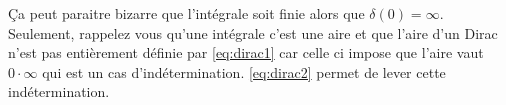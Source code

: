 Ça peut paraitre bizarre que l'intégrale soit finie alors que
$\delta(0) = \infty$.
Seulement, rappelez vous qu'une intégrale c'est une aire et que
l'aire d'un Dirac n'est pas entièrement définie par \eqref{eq:dirac1}
car celle ci impose que l'aire vaut $0 \cdot \infty$ qui est un cas
d'indétermination.
\eqref{eq:dirac2} permet de lever cette indétermination.



